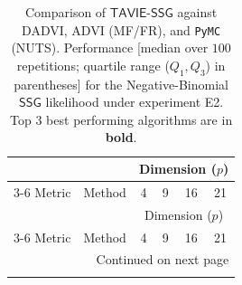 \documentclass[12pt]{article}
\numberwithin{equation}{section}
\newcommand{\tssg}{\mathsf{TAVIE}\text{-}\mathsf{SSG}}
\begin{document}
{\scriptsize
\setlength{\tabcolsep}{3pt} %
\renewcommand{\arraystretch}{1.15}%
\begin{longtable}{llcccc}
\caption{\footnotesize{Comparison of $\tssg$ against DADVI, ADVI (MF/FR), and \texttt{PyMC} (NUTS). Performance [median over $100$ repetitions; quartile range ($Q_1, Q_3$)  in parentheses] for the Negative-Binomial $\mathsf{SSG}$ likelihood under experiment E2. { Top $3$ best performing algorithms are in \textbf{bold}.}}} 
\label{tab:negbin_singlen_multip}\\
\toprule
\toprule
 &  & \multicolumn{4}{c}{Dimension ($p$)} \\
\cmidrule(lr){3-6}
Metric & Method & 4 & 9 & 16 & 21 \\
\midrule
\endfirsthead
\toprule
 &  & \multicolumn{4}{c}{Dimension ($p$)} \\
\cmidrule(lr){3-6}
Metric & Method & 4 & 9 & 16 & 21 \\
\midrule
\endhead
\midrule
\multicolumn{6}{r}{Continued on next page} \\
\midrule
\endfoot
\bottomrule
\endlastfoot


\end{longtable}}
\end{document}
